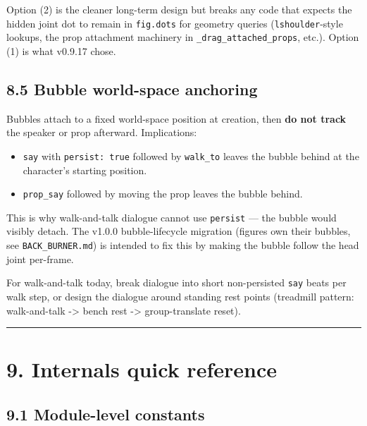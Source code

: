 \documentclass[
  12pt,
  letterpaper,
]{book}
\providecommand{\tightlist}{%
  \setlength{\itemsep}{0pt}\setlength{\parskip}{0pt}}
\begin{document}
Option (2) is the cleaner long-term design but breaks any code that
expects the hidden joint dot to remain in \texttt{fig.dots} for
geometry queries (\texttt{lshoulder}-style lookups, the prop
attachment machinery in \texttt{\_drag\_attached\_props}, etc.).
Option (1) is what v0.9.17 chose.

\subsection{8.5 Bubble world-space
anchoring}\label{bubble-world-space-anchoring}

Bubbles attach to a fixed world-space position at creation, then
\textbf{do not track} the speaker or prop afterward. Implications:

\begin{itemize}
\tightlist
\item
  \texttt{say} with \texttt{persist:\ true} followed by
  \texttt{walk\_to} leaves the bubble behind at the character's starting
  position.
\item
  \texttt{prop\_say} followed by moving the prop leaves the bubble
  behind.
\end{itemize}

This is why walk-and-talk dialogue cannot use \texttt{persist} --- the
bubble would visibly detach. The v1.0.0 bubble-lifecycle migration
(figures own their bubbles, see \texttt{BACK\_BURNER.md}) is intended to
fix this by making the bubble follow the head joint per-frame.

For walk-and-talk today, break dialogue into short non-persisted
\texttt{say} beats per walk step, or design the dialogue around standing
rest points (treadmill pattern: walk-and-talk -\textgreater{} bench rest
-\textgreater{} group-translate reset).

\begin{center}\rule{0.5\linewidth}{0.5pt}\end{center}

\section{9. Internals quick reference}\label{internals-quick-reference}

\subsection{9.1 Module-level constants}\label{module-level-constants}
\end{document}
